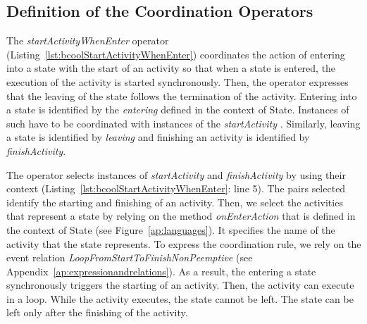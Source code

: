 \subsection{Definition of the Coordination Operators}
The \emph{startActivityWhenEnter} operator (Listing~\ref{lst:bcoolStartActivityWhenEnter}) coordinates the action of entering into a state with the start of an activity so that when a state is entered, the execution of the activity is started synchronously. Then, the operator expresses that the leaving of the state follows the termination of the activity. Entering into a state is identified by the \textit{entering} \dse defined in the context of State. Instances of such \dse have to be coordinated with instances of the \textit{startActivity} \dse. Similarly, leaving a state is identified by \dse \textit{leaving} and finishing an activity is identified by \dse \textit{finishActivity}. 


The operator selects instances of \dse \emph{startActivity} and \emph{finishActivity} by using their context (Listing~\ref{lst:bcoolStartActivityWhenEnter}: line 5). The pairs selected identify the starting and finishing of an activity. Then, we select the activities that represent a state by relying on the method \emph{onEnterAction} that is defined in the context of State (see Figure~\ref{ap:languages}). It specifies the name of the activity that the state represents. To express the coordination rule, we rely on the event relation \emph{LoopFromStartToFinishNonPeemptive} (see Appendix~\ref{ap:expressionandrelations}).  As a result, the entering a state synchronously triggers the starting of an activity. Then, the activity can execute in a loop. While the activity executes, the state cannot be left. The state can be left only after the finishing of the activity. 

